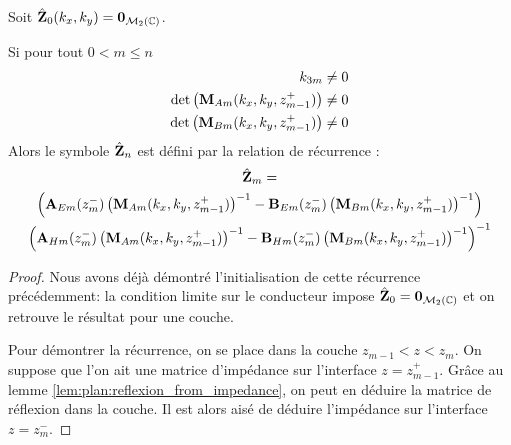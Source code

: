         \begin{thm}
            \label{thm:imp:fourier:plan:multi_couche}
            Soit \(\hat {\mathbf{Z}}_0(k_x,k_y) = \mathbf{0}_{\mathcal{M}_2(\mathbb C)}\).

            Si pour tout \(0 < m \le n\)
            \begin{align}
                k_{3m} &\not = 0
                \\
                \det\left(\mathbf{M}_{Am}(k_x,k_y,z_{m-1}^+)\right) &\not = 0 
                \\
                \det\left(\mathbf{M}_{Bm}(k_x,k_y,z_{m-1}^+)\right) &\not = 0
            \end{align}
            Alors le symbole \(\hat {\mathbf{Z}}_n\) est défini par la relation de récurrence :
            \begin{multline*}
                \hat {\mathbf{Z}}_m = \\
                \left(\mathbf{A}_{Em}(z_{m}^-)\left(\mathbf{M}_{Am}(k_x,k_y,z_{m-1}^+)\right)^{-1} - \mathbf{B}_{Em}(z_{m}^-) \left(\mathbf{M}_{Bm}(k_x,k_y,z_{m-1}^+)\right)^{-1}\right)
                \\
                \left(\mathbf{A}_{Hm}(z_{m}^-)\left(\mathbf{M}_{Am}(k_x,k_y,z_{m-1}^+)\right)^{-1} - \mathbf{B}_{Hm}(z_{m}^-) \left(\mathbf{M}_{Bm}(k_x,k_y,z_{m-1}^+)\right)^{-1}\right)^{-1}
            \end{multline*}
        \end{thm}

        \begin{proof}
            Nous avons déjà démontré l'initialisation de cette récurrence précédemment: la condition limite sur le conducteur impose \(\hat {\mathbf{Z}}_0 = \mathbf{0}_{\mathcal{M}_2(\mathbb C)}\) et on retrouve le résultat pour une couche.

            Pour démontrer la récurrence, on se place dans la couche \(z_{m-1}<z<z_m\). On suppose que l'on ait une matrice d'impédance sur l'interface \(z= z_{m-1}^+\). Grâce au lemme \ref{lem:plan:reflexion_from_impedance}, on peut en déduire la matrice de réflexion dans la couche. Il est alors aisé de déduire l'impédance sur l'interface \(z=z_m^-\).
        \end{proof}
